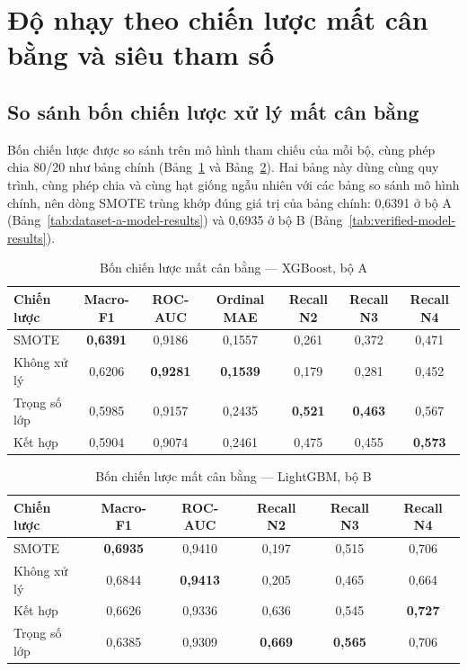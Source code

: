 \section{Độ nhạy theo chiến lược mất cân bằng và siêu tham số}

\subsection{So sánh bốn chiến lược xử lý mất cân bằng}
\label{sec:imbalance-combined-results}

Bốn chiến lược được so sánh trên mô hình tham chiếu của mỗi bộ, cùng phép chia 80/20 như bảng chính (Bảng~\ref{tab:imbalance-combined-a} và Bảng~\ref{tab:imbalance-combined-b}). Hai bảng này dùng cùng quy trình, cùng phép chia và cùng hạt giống ngẫu nhiên với các bảng so sánh mô hình chính, nên dòng SMOTE trùng khớp đúng giá trị của bảng chính: 0,6391 ở bộ A (Bảng~\ref{tab:dataset-a-model-results}) và 0,6935 ở bộ B (Bảng~\ref{tab:verified-model-results}).

\begin{table}[H]
\centering
\caption{Bốn chiến lược mất cân bằng --- XGBoost, bộ A}
\label{tab:imbalance-combined-a}
\begin{tabular}{|l|c|c|c|c|c|c|}
\hline
Chiến lược & Macro-F1 & ROC-AUC & Ordinal MAE & Recall N2 & Recall N3 & Recall N4\\
\hline
SMOTE & \textbf{0,6391} & 0,9186 & 0,1557 & 0,261 & 0,372 & 0,471\\
Không xử lý & 0,6206 & \textbf{0,9281} & \textbf{0,1539} & 0,179 & 0,281 & 0,452\\
Trọng số lớp & 0,5985 & 0,9157 & 0,2435 & \textbf{0,521} & \textbf{0,463} & 0,567\\
Kết hợp & 0,5904 & 0,9074 & 0,2461 & 0,475 & 0,455 & \textbf{0,573}\\
\hline
\end{tabular}
\end{table}

\begin{table}[H]
\centering
\caption{Bốn chiến lược mất cân bằng --- LightGBM, bộ B}
\label{tab:imbalance-combined-b}
\begin{tabular}{|l|c|c|c|c|c|}
\hline
Chiến lược & Macro-F1 & ROC-AUC & Recall N2 & Recall N3 & Recall N4\\
\hline
SMOTE & \textbf{0,6935} & 0,9410 & 0,197 & 0,515 & 0,706\\
Không xử lý & 0,6844 & \textbf{0,9413} & 0,205 & 0,465 & 0,664\\
Kết hợp & 0,6626 & 0,9336 & 0,636 & 0,545 & \textbf{0,727}\\
Trọng số lớp & 0,6385 & 0,9309 & \textbf{0,669} & \textbf{0,565} & 0,706\\
\hline
\end{tabular}
\end{table}

